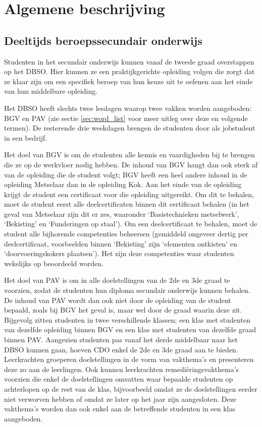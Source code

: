 \documentclass[a4paper]{article}
\begin{document}
\newpage
\section{Algemene beschrijving}  \label{sec:general_descr}%
\subsection{Deeltijds beroepssecundair onderwijs}
Studenten in het secundair onderwijs kunnen vanaf de tweede graad overstappen op het DBSO. Hier kunnen ze een praktijkgerichte opleiding volgen die zorgt dat ze klaar zijn om een specifiek beroep van hun keuze uit te oefenen aan het einde van hun middelbare opleiding.

Het DBSO heeft slechts twee lesdagen waarop twee vakken worden aangeboden: BGV en PAV (zie sectie \ref{sec:word_list} voor meer uitleg over deze en volgende termen). De resterende drie weekdagen brengen de studenten door als jobstudent in een bedrijf.

Het doel van BGV is om de studenten alle kennis en vaardigheden bij te brengen die ze op de werkvloer nodig hebben. De inhoud van BGV hangt dan ook sterk af van de opleiding die de student volgt; BGV heeft een heel andere inhoud in de opleiding Metselaar dan in de opleiding Kok. Aan het einde van de opleiding krijgt de student een certificaat voor die opleiding uitgereikt. Om dit te behalen, moet de student eerst alle deelcertificaten binnen dit certificaat behalen (in het geval van Metselaar zijn dit er zes, waaronder `Basistechnieken metselwerk', `Bekisting' en `Funderingen op staal'). Om een deelcertificaat te behalen, moet de student alle bijhorende competenties beheersen (gemiddeld ongeveer dertig per deelcertificaat, voorbeelden binnen `Bekisting' zijn `elementen ontkisten' en `doorvoeringskokers plaatsen'). Het zijn deze competenties waar studenten wekelijks op beoordeeld worden.

Het doel van PAV is om in alle doelstellingen van de 2de en 3de graad te voorzien, zodat de studenten hun diploma secundair onderwijs kunnen behalen. De inhoud van PAV wordt dan ook niet door de opleiding van de student bepaald, zoals bij BGV het geval is, maar wel door de graad waarin deze zit. Bijgevolg zitten studenten in twee verschillende klassen; een klas met studenten van dezelfde opleiding binnen BGV en een klas met studenten van dezelfde graad binnen PAV. Aangezien studenten pas vanaf het derde middelbaar naar het DBSO kunnen gaan, hoeven CDO enkel de 2de en 3de graad aan te bieden. Leerkrachten groeperen doelstellingen in de vorm van vakthema's en presenteren deze zo aan de leerlingen. Ook kunnen leerkrachten remediëringsvakthema's voorzien die enkel de doelstellingen omvatten waar bepaalde studenten op achterlopen op de rest van de klas, bijvoorbeeld omdat ze de doelstellingen eerder niet verworven hebben of omdat ze later op het jaar zijn aangesloten. Deze vakthema's worden dan ook enkel aan de betreffende studenten in een klas aangeboden. 
\end{document}

